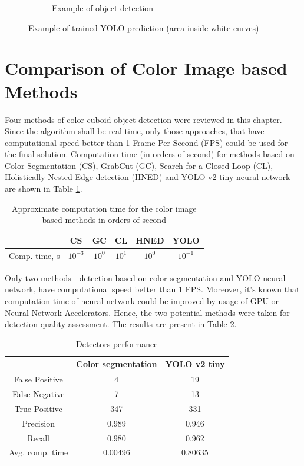 \documentclass{ctuthesis}
\begin{document}
\begin{figure}[htbp]
\begin{subfigure}{0.475\textwidth}
         \caption{Example of object detection}
         \label{fig:y6}
     \end{subfigure}
        \caption{Example of trained YOLO prediction (area inside white curves)}
        \label{fig:yolo}
\end{figure}

\section{Comparison of Color Image based Methods}
Four methods of color cuboid object detection were reviewed in this chapter. Since the algorithm shall be real-time, only those approaches, that have computational speed better than 1 Frame Per Second (FPS) could be used for the final solution. Computation time (in orders of second) for methods based on Color Segmentation (CS), GrabCut (GC), Search for a Closed Loop (CL), Holistically-Nested Edge detection (HNED) and YOLO v2 tiny neural network are shown in Table \ref{table:2}.

\begin{table}[h!]
\centering
 \begin{tabular}{||c c c c c c||} 
 \hline
 & CS & GC & CL & HNED & YOLO \\ [0.5ex] 
 \hline\hline
 Comp. time, s & $10^{-3}$ & $10^0$ & $10^1$ & $10^0$ & $10^{-1}$ \\ 
 [1ex] 
 \hline
\end{tabular}
\caption{Approximate computation time for the color image based methods in orders of second}
\label{table:2}
\end{table}

Only two methods - detection based on color segmentation and YOLO neural network, have computational speed better than 1 FPS. Moreover, it's known that computation time of neural network could be improved by usage of GPU or Neural Network Accelerators. Hence, the two potential methods were taken for detection quality assessment. The results are present in Table \ref{table:3}.

\begin{table}[h!]
\centering
 \begin{tabular}{||c c c ||} 
 \hline
  & Color segmentation & YOLO v2 tiny \\ [0.5ex] 
 \hline\hline
  False Positive & 4 & 19  \\ 
 \hline
  False Negative & 7 & 13  \\ 
 \hline
  True Positive & 347 & 331  \\ 
 \hline
 Precision & 0.989 & 0.946  \\ 
 \hline
 Recall & 0.980 & 0.962 \\ 
  \hline
 Avg. comp. time & 0.00496 & 0.80635 \\ 
 [1ex] 
 \hline
\end{tabular}
\caption{Detectors performance}
\label{table:3}
\end{table}
\end{document}
